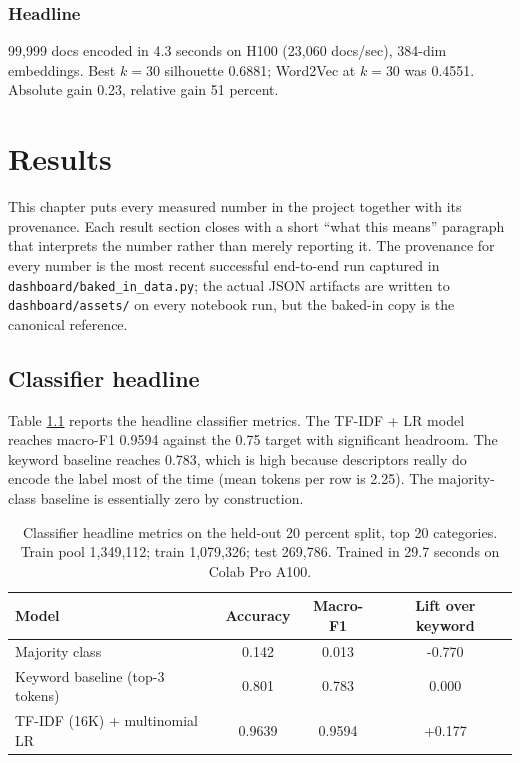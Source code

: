 \documentclass[11pt,letterpaper]{book}
\begin{document}
\subsection*{Headline}

99,999 docs encoded in 4.3 seconds on H100 (23,060 docs/sec), 384-dim embeddings. Best $k = 30$ silhouette 0.6881; Word2Vec at $k = 30$ was 0.4551. Absolute gain 0.23, relative gain 51 percent.


\chapter{Results}
\label{ch:results}

This chapter puts every measured number in the project together with its provenance. Each result section closes with a short ``what this means'' paragraph that interprets the number rather than merely reporting it. The provenance for every number is the most recent successful end-to-end run captured in \texttt{dashboard/baked\_in\_data.py}; the actual JSON artifacts are written to \texttt{dashboard/assets/} on every notebook run, but the baked-in copy is the canonical reference.

\section{Classifier headline}
\label{sec:results-classifier}

Table \ref{tab:classifier-head} reports the headline classifier metrics. The TF-IDF + LR model reaches macro-F1 0.9594 against the 0.75 target with significant headroom. The keyword baseline reaches 0.783, which is high because descriptors really do encode the label most of the time (mean tokens per row is 2.25). The majority-class baseline is essentially zero by construction.

\begin{table}[h]
  \caption{Classifier headline metrics on the held-out 20 percent split, top 20 categories. Train pool 1,349,112; train 1,079,326; test 269,786. Trained in 29.7 seconds on Colab Pro A100.}
  \label{tab:classifier-head}
  \centering
  \begin{tabular}{lccc}
    \toprule
    Model & Accuracy & Macro-F1 & Lift over keyword \\
    \midrule
    Majority class & 0.142 & 0.013 & -0.770 \\
    Keyword baseline (top-3 tokens) & 0.801 & 0.783 & 0.000 \\
    TF-IDF (16K) + multinomial LR & 0.9639 & 0.9594 & +0.177 \\
    \bottomrule
  \end{tabular}
\end{table}
\end{document}
